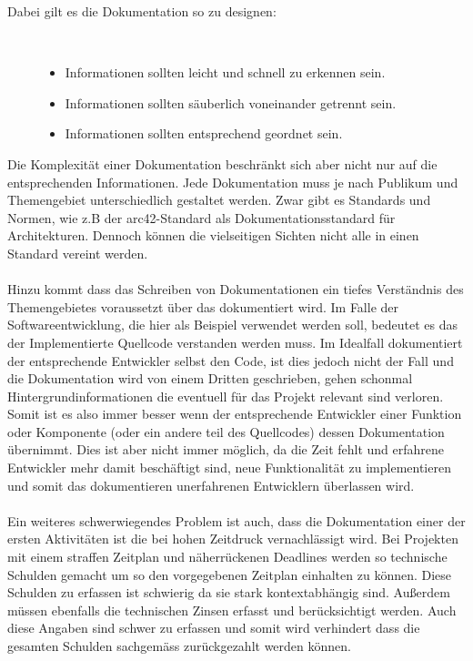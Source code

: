 \documentclass[a4paper,12pt]{scrartcl}
\begin{document}
\begin{description}
   \item[Dabei gilt es die Dokumentation so zu designen:]~\par
   \begin{itemize}
      \item Informationen sollten leicht und schnell zu erkennen sein.
      \item Informationen sollten säuberlich voneinander getrennt sein. 
      \item Informationen sollten entsprechend geordnet sein.
   \end{itemize}
\end{description}
Die Komplexität einer Dokumentation beschränkt sich aber nicht nur auf die entsprechenden Informationen. Jede Dokumentation muss je nach Publikum und Themengebiet unterschiedlich gestaltet werden. Zwar gibt es Standards und Normen, wie z.B der arc42-Standard als Dokumentationsstandard für Architekturen. Dennoch können die vielseitigen Sichten nicht alle in einen Standard vereint werden.
\\\\
Hinzu kommt dass das Schreiben von Dokumentationen ein tiefes Verständnis des Themengebietes voraussetzt über das dokumentiert wird. Im Falle der Softwareentwicklung, die hier als Beispiel verwendet werden soll, bedeutet es das der Implementierte Quellcode verstanden werden muss. Im Idealfall dokumentiert der entsprechende Entwickler selbst den Code, ist dies jedoch nicht der Fall und die Dokumentation wird von einem Dritten geschrieben, gehen schonmal Hintergrundinformationen die eventuell für das Projekt relevant sind verloren. Somit ist es also immer besser wenn der entsprechende Entwickler einer Funktion oder Komponente (oder ein andere teil des Quellcodes) dessen Dokumentation übernimmt. Dies ist aber nicht immer möglich, da die Zeit fehlt und erfahrene Entwickler mehr damit beschäftigt sind, neue Funktionalität zu implementieren und somit das dokumentieren unerfahrenen Entwicklern überlassen wird. 
\\\\ 
Ein weiteres schwerwiegendes Problem ist auch, dass die Dokumentation einer der ersten Aktivitäten ist die bei hohen Zeitdruck vernachlässigt wird. Bei Projekten mit einem straffen Zeitplan und näherrückenen Deadlines werden so technische Schulden gemacht um so den vorgegebenen Zeitplan einhalten zu können. Diese Schulden zu erfassen ist schwierig da sie stark kontextabhängig sind. Außerdem müssen ebenfalls die technischen Zinsen erfasst und berücksichtigt werden. Auch diese Angaben sind schwer zu erfassen und somit wird verhindert dass die gesamten Schulden sachgemäss zurückgezahlt werden können.
\end{document}
